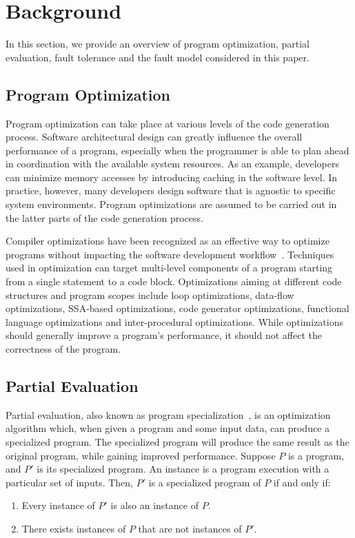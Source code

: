 \section{Background}
\label{sec:background}

In this section, we provide an overview of program optimization, partial evaluation, fault tolerance and the fault model considered in this paper.

\subsection{Program Optimization}
\label{sec:program_opt}
Program optimization can take place at various levels of the code generation process.
Software architectural design can greatly influence the overall performance of a program, especially when the programmer is able to plan ahead in coordination with the available system resources.
As an example, developers can minimize memory accesses by introducing caching in the software level.
In practice, however, many developers design software that is agnostic to specific system environments.
Program optimizations are assumed to be carried out in the latter parts of the code generation process. 

Compiler optimizations have been recognized as an effective way to optimize programs without impacting the software development workflow~\cite{Lee2006}.
Techniques used in optimization can target multi-level components of a program starting from a single statement to a code block. 
Optimizations aiming at different code structures and program scopes include loop optimizations, data-flow optimizations, SSA-based optimizations, code generator optimizations, functional language optimizations and inter-procedural optimizations. While optimizations should generally improve a program's performance, it should not affect the correctness of the program.

\subsection{Partial Evaluation}
\label{sec:partial_evaluation}
Partial evaluation, also known as program specialization~\cite{Futamura}, is an optimization algorithm which, when given a program and some input data, can produce a specialized program. The specialized program will produce the same result as the original program, while gaining improved performance. Suppose $P$ is a program, and $P'$ is its specialized program. An instance is a program execution with a particular set of inputs. Then, $P'$ is a specialized program of $P$ if and only if:
\begin{enumerate}
\item Every instance of $P'$ is also an instance of $P$.
\item There exists instances of $P$ that are not instances of $P'$.
\end{enumerate}

